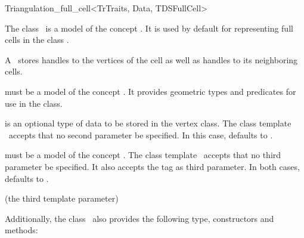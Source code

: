 \begin{ccRefClass}{Triangulation_full_cell<TrTraits, Data, TDSFullCell>}

\ccDefinition

The class \ccRefName\ is a model of the concept . It
is used by default for representing full cells in the class
.

A \ccRefName\ stores handles to the vertices of the cell as well as handles
to its neighboring cells.


\ccParameters

 must be a model of the concept . It
provides geometric types and predicates for use in the
 class.

 is an optional type of data to be stored in the vertex class. The
class template \ccRefName\ accepts that no second parameter be specified. In
this case,  defaults to .

 must be a model of the concept .
The class template \ccRefName\ accepts that no third parameter be specified.
It also accepts the tag  as third parameter. In both
cases,  defaults to .

\ccInheritsFrom

 (the third template parameter)

\ccIsModel


Additionally, the class \ccRefName\ also provides the following type,
constructors and methods:

\ccTypes


\ccCreation
{}



\end{ccRefClass}
